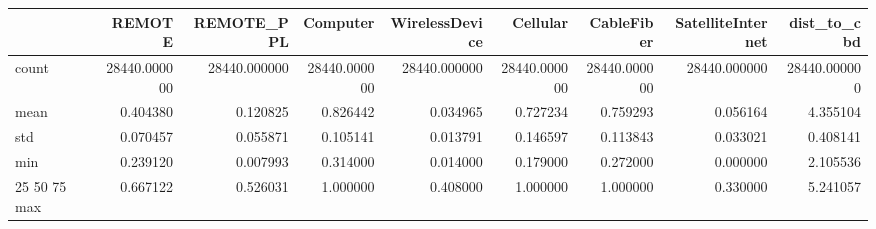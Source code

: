 \begin{tabular}{lrrrrrrrr}
\toprule
 & REMOTE & REMOTE_PPL & Computer & WirelessDevice & Cellular & CableFiber & SatelliteInternet & dist_to_cbd \\
\midrule
count & 28440.000000 & 28440.000000 & 28440.000000 & 28440.000000 & 28440.000000 & 28440.000000 & 28440.000000 & 28440.000000 \\
mean & 0.404380 & 0.120825 & 0.826442 & 0.034965 & 0.727234 & 0.759293 & 0.056164 & 4.355104 \\
std & 0.070457 & 0.055871 & 0.105141 & 0.013791 & 0.146597 & 0.113843 & 0.033021 & 0.408141 \\
min & 0.239120 & 0.007993 & 0.314000 & 0.014000 & 0.179000 & 0.272000 & 0.000000 & 2.105536 \\
25%
50%
75%
max & 0.667122 & 0.526031 & 1.000000 & 0.408000 & 1.000000 & 1.000000 & 0.330000 & 5.241057 \\
\bottomrule
\end{tabular}
